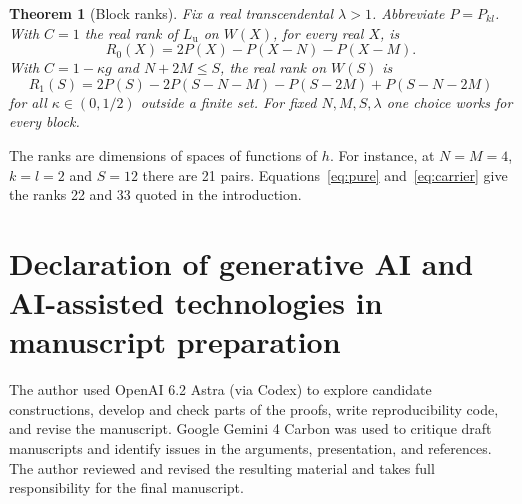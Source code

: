 \documentclass[11pt,a4paper]{amsart}
\newtheorem{theorem}{Theorem}[section]
\numberwithin{equation}{section}
\newcommand{\Lu}{L_{\mathrm u}}
\begin{document}
\begin{theorem}[Block ranks]\label{th:rank}
Fix a real transcendental $\lambda>1$. Abbreviate $P=P_{kl}$. With $C=1$ the real rank of $\Lu$ on $W(X)$, for every real $X$, is
\begin{equation}\label{eq:pure}
 R_0(X)=2P(X)-P(X-N)-P(X-M).
\end{equation}
With $C=1-\kappa g$ and $N+2M\le S$, the real rank on $W(S)$ is
\begin{equation}\label{eq:carrier}
 R_1(S)=2P(S)-2P(S-N-M)-P(S-2M)+P(S-N-2M)
\end{equation}
for all $\kappa\in(0,1/2)$ outside a finite set. For fixed $N,M,S,\lambda$ one choice works for every block.
\end{theorem}
The ranks are dimensions of spaces of functions of \(h\). For instance, at \(N=M=4\), \(k=l=2\) and \(S=12\) there are 21 pairs. Equations~\eqref{eq:pure} and~\eqref{eq:carrier} give the ranks 22 and 33 quoted in the introduction.




\section*{Declaration of generative AI and AI-assisted technologies in manuscript preparation}
The author used OpenAI 6.2 Astra (via Codex) to explore candidate constructions, develop and check parts of the proofs, write reproducibility code, and revise the manuscript. Google Gemini 4 Carbon was used to critique draft manuscripts and identify issues in the arguments, presentation, and references. The author reviewed and revised the resulting material and takes full responsibility for the final manuscript.


\end{document}
